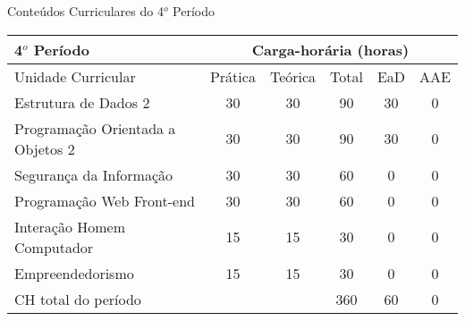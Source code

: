 \begin{quadro}[ht!]
\centering
\caption{Conteúdos Curriculares do 4$^o$ Período}\label{qua:periodo4}
\begin{tabular}{|p{8.0cm}|c|c|c|c|c|}
\hline
\rowcolor{blue1} 4$^o$ Período & \multicolumn{5}{|c|}{\centering Carga-horária (horas)} \\ \hline
\rowcolor{blue1} Unidade Curricular & Prática & Teórica & Total & EaD & AAE \\ \hline
Estrutura de Dados 2 & 30 & 30 & 90 & 30	&	0 \\	\hline
Programação Orientada a Objetos 2 & 30 & 30 & 90 & 30	&	0 \\	\hline
Segurança da Informação & 30 & 30 & 60 & 0	&	0 \\	\hline
Programação Web Front-end & 30 & 30 & 60 & 0	&	0 \\	\hline
Interação Homem Computador & 15 & 15 & 30 & 0	&	0 \\	\hline
Empreendedorismo & 15 & 15 & 30 & 0	&	0 \\	\hline
CH total do período & \multicolumn{2}{p{3.3cm}|}{\cellcolor{blue1}} & 360 & 60	&	0 \\ \hline
\end{tabular} \end{quadro}
